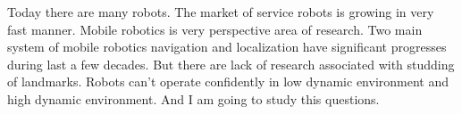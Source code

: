 Today there are many robots. The market of service robots is growing in very fast manner. Mobile robotics is very perspective area of research. Two main system of mobile robotics navigation and localization have significant progresses during last a few decades. But there are lack of research associated with studding of landmarks. Robots can't operate confidently in low dynamic environment and high dynamic environment. And I am going to study this questions. 